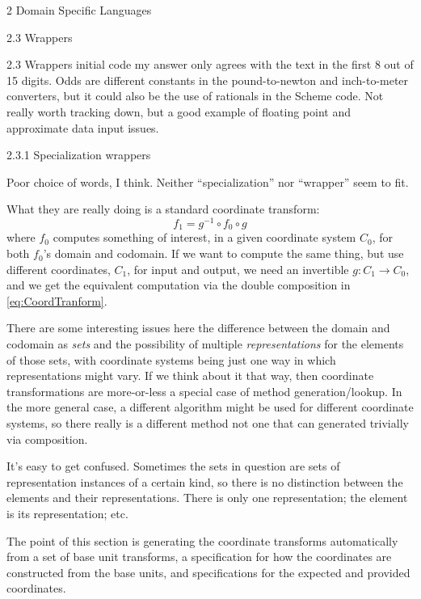 \documentclass[12pt]{PalisadesLakesBook}
\begin{document}
\begin{plSection}{}
\begin{plSection}{2 Domain Specific Languages}
\begin{plSection}{2.3 Wrappers}
\begin{plSection}{2.3 Wrappers initial code}
\TODO my answer only agrees with the text in the first 8 out of
15 digits. 
Odds are different constants in the {\schemeFont pound-to-newton}
and {\schemeFont inch-to-meter} converters, 
but it could also be the use of rationals in the Scheme code.
Not really worth tracking down, but a good example
of floating point and approximate data input issues.
\end{plSection}%
\begin{plSection}{2.3.1 Specialization wrappers}

Poor choice of words, I think.
Neither ``specialization'' nor ``wrapper'' seem to fit.

What they are really doing is a standard coordinate transform:
\begin{equation}\label{eq:CoordTranform}
f_{1} = g^{-1} \circ f_{0} \circ g
\end{equation}
where $f_{0}$ computes something of interest,
in a given coordinate system $C_{0}$,
for both $f_{0}$'s domain and codomain.
If we want to compute the same thing,
but use different coordinates, $C_{1}$, for input and output,
we need an invertible $g : C_{1} \rightarrow C_{0}$,
and we get the equivalent computation via the double
composition in \cref{eq:CoordTranform}.

There are some interesting issues here the difference between
the domain and codomain as \emph{sets}
and the possibility of multiple \emph{representations}
for the elements of those sets, 
with coordinate systems being just one way
in which representations might vary.
If we think about it that way,
then coordinate transformations are more-or-less a special case
of method generation/lookup.
In the more general case, a different algorithm might be
used for different coordinate systems,
so there really is a different method
not one that can generated trivially via composition.

It's easy to get confused. 
Sometimes the sets in question
are sets of representation instances of a certain kind,
so there is no distinction between the elements 
and their representations.
There is only one representation; 
the element is its representation; etc.

The point of this section is generating the coordinate transforms
automatically from a set of base unit transforms,
a specification for how the coordinates are constructed
from the base units,
and specifications for the expected and provided coordinates.


\end{plSection}
\end{plSection}
\end{plSection}
\end{plSection}
\end{document}
